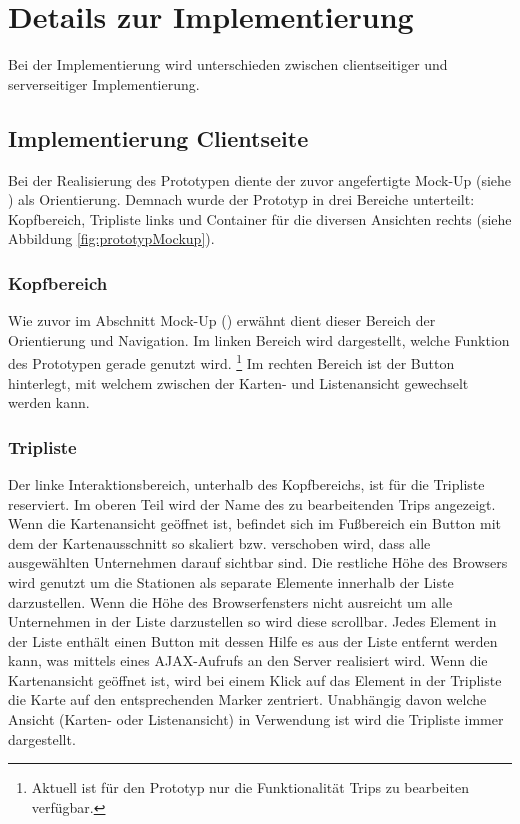 \documentclass[Bachelorarbeit.tex]{subfiles}
\begin{document}
\section{Details zur Implementierung}
\label{chap:implementierung:sec:details}
Bei der Implementierung wird unterschieden zwischen clientseitiger und serverseitiger Implementierung.

\subsection{Implementierung Clientseite}
Bei der Realisierung des Prototypen diente der zuvor angefertigte Mock-Up (siehe ) als Orientierung. 
Demnach wurde der Prototyp in drei Bereiche unterteilt: Kopfbereich, Tripliste links und Container für die diversen Ansichten rechts (siehe Abbildung \ref{fig:prototypMockup}).


\subsubsection*{Kopfbereich}
Wie zuvor im Abschnitt Mock-Up () erwähnt dient dieser Bereich der Orientierung und Navigation.
Im linken Bereich wird dargestellt, welche Funktion des Prototypen gerade genutzt wird.
\footnote{Aktuell ist für den Prototyp nur die Funktionalität Trips zu bearbeiten verfügbar.}
Im rechten Bereich ist der Button hinterlegt, mit welchem zwischen der Karten- und Listenansicht gewechselt werden kann.

\subsubsection*{Tripliste}
Der linke Interaktionsbereich, unterhalb des Kopfbereichs, ist für die Tripliste reserviert.
Im oberen Teil wird der Name des zu bearbeitenden Trips angezeigt.
Wenn die Kartenansicht geöffnet ist, befindet sich im Fußbereich ein Button mit dem der Kartenausschnitt so skaliert bzw. verschoben wird, dass alle ausgewählten Unternehmen darauf sichtbar sind.
Die restliche Höhe des Browsers wird genutzt um die Stationen als separate Elemente innerhalb der Liste darzustellen.
Wenn die Höhe des Browserfensters nicht ausreicht um alle Unternehmen in der Liste darzustellen so wird diese scrollbar.
Jedes Element in der Liste enthält einen Button mit dessen Hilfe es aus der Liste entfernt werden kann, was mittels eines \ac{AJAX}-Aufrufs an den Server realisiert wird. 
Wenn die Kartenansicht geöffnet ist, wird bei einem Klick auf das Element in der Tripliste die Karte auf den entsprechenden Marker zentriert.
Unabhängig davon welche Ansicht (Karten- oder Listenansicht) in Verwendung ist wird die Tripliste immer dargestellt.
\end{document}
